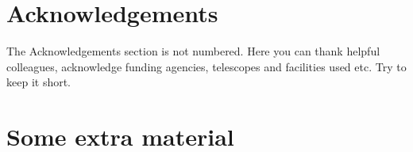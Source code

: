 \documentclass[a4paper,fleqn,usenatbib]{mnras}
\begin{document}
\section*{Acknowledgements}

The Acknowledgements section is not numbered. Here you can thank helpful
colleagues, acknowledge funding agencies, telescopes and facilities used etc.
Try to keep it short.










\appendix

\section{Some extra material}


\bsp	%
\label{lastpage}
\end{document}
